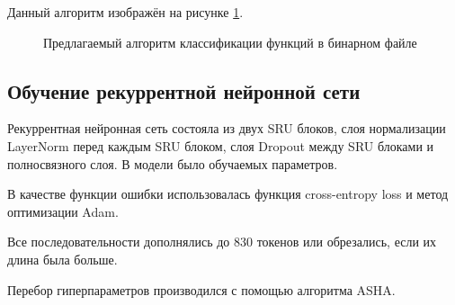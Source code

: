 Данный алгоритм изображён на рисунке \ref{ris:sugested_approach}.
\begin{figure}[h]
    \caption{Предлагаемый алгоритм классификации функций в бинарном файле}
    \label{ris:sugested_approach}
\end{figure}

\subsection{Обучение рекуррентной нейронной сети}
Рекуррентная нейронная сеть состояла из двух SRU\cite{lei2018simple} блоков, слоя нормализации LayerNorm\cite{LayerNorm} перед каждым SRU блоком, слоя Dropout между SRU блоками и полносвязного слоя. В модели было обучаемых параметров.

В качестве функции ошибки использовалась функция cross-entropy loss и метод оптимизации Adam.

Все последовательности дополнялись до 830 токенов или обрезались, если их длина была больше.

Перебор гиперпараметров производился с помощью алгоритма ASHA\cite{li2018massively}.

